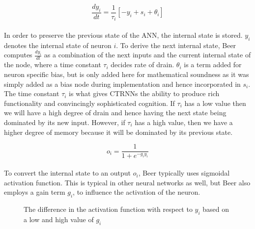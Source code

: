\begin{equation}
\frac{dy_i}{dt} = \frac{1}{\tau_i}[-y_i + s_i + \theta_i]
\end{equation}
\\
In order to preserve the previous state of the ANN, the internal state is stored. 
$y_i$ denotes the internal state of neuron $i$.
To derive the next internal state, Beer computes $\frac{dy_i}{dt}$ as a combination of the next inputs and the current internal state of the node, where a time constant $\tau_i$ decides rate of drain. 
$\theta_i$ is a term added for neuron specific bias, but is only added here for mathematical soundness as it was simply added as a bias node during implementation and hence incorporated in $s_i$.
The time constant $\tau_i$ is what gives CTRNNs the ability to produce rich functionality and convincingly sophisticated cognition.
If $\tau_i$ has a low value then we will have a high degree of drain and hence having the next state being dominated by its new input.
However, if $\tau_i$ has a high value, then we have a higher degree of memory because it will be dominated by its previous state.

\begin{equation}
o_i = \frac{1}{1 + e^{-g_{i}y_{i}}}
\end{equation}
\\
To convert the internal state to an output $o_i$, Beer typically uses sigmoidal activation function.
This is typical in other neural networks as well, but Beer also employs a gain term $g_i$, to influence the activation of the neuron.
\\
\begin{figure}[H]
	\centering
{}
	\caption{The difference in the activation function with respect to $y_i$ based on a low and high value of $g_i$}
	\label{CTRNN-gGraph}
\end{figure}

